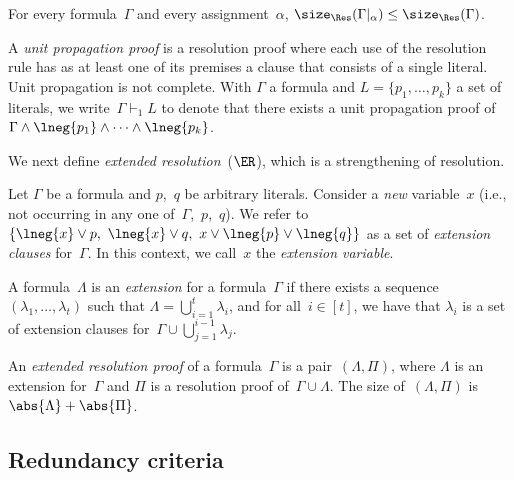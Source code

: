 \documentclass[10pt,a4paper]{article}
\begin{document}
\begin{lemma}\label{thm:resolution-under-restrictions}
  For every formula~$\Gamma$ and every assignment~$\alpha$,
  $\size_\Res(\Gamma|_\alpha) \leq \size_\Res(\Gamma)$.
\end{lemma}

A \emph{unit propagation proof} is a resolution proof
where each use of the resolution rule
has as at least one of its premises
a clause that consists of a single literal.
Unit propagation is not complete.
With $\Gamma$ a formula and $L = \{p_1, \dots, p_k\}$ a set of literals,
we write~$\Gamma \vdash_1 L$ to denote that
there exists a unit propagation proof
of~$\Gamma \land \lneg{p_1} \land \dots \land \lneg{p_k}$.

We next define \emph{extended resolution}~($\ER$),
which is a strengthening of resolution.

\begin{definition}\label{def:extension-clauses}
  Let $\Gamma$ be a formula and $p$,~$q$ be arbitrary literals.
  Consider a \emph{new} variable~$x$
  (i.e., not occurring in any one of~$\Gamma$,~$p$,~$q$).
  We refer to $\{\lneg{x} \lor p,\ \lneg{x} \lor q,\ x \lor \lneg{p} \lor \lneg{q}\}$
  as a set of \emph{extension clauses} for~$\Gamma$.
  In this context, we call~$x$ the \emph{extension variable}.
\end{definition}

\begin{definition}
  A formula~$\Lambda$ is an \emph{extension} for a formula~$\Gamma$
  if there exists a sequence~$(\lambda_1, \dots, \lambda_t)$
  such that $\Lambda = \bigcup_{i = 1}^t \lambda_i$,
  and for all~$i \in [t]$, we have that $\lambda_i$ is a set of
  extension clauses for~$\Gamma \cup \bigcup_{j = 1}^{i - 1} \lambda_j$.
\end{definition}

\begin{definition}
  An \emph{extended resolution proof} of a formula~$\Gamma$
  is a pair~$(\Lambda, \Pi)$,
  where $\Lambda$ is an extension for~$\Gamma$
  and $\Pi$ is a resolution proof of~$\Gamma \cup \Lambda$.
  The size of~$(\Lambda, \Pi)$ is~$\abs{\Lambda} + \abs{\Pi}$.
\end{definition}

\subsection{Redundancy criteria}
\label{sec:redundancy-criteria}
\end{document}
